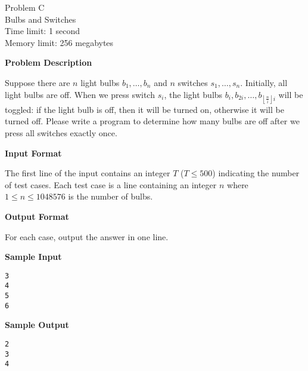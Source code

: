 \documentclass[11pt]{article}
\begin{document}
\begin{center}
    {\LARGE Problem C}\\
    {\Large Bulbs and Switches}\\
    {Time limit: 1 second}\\
    {Memory limit: 256 megabytes}
\end{center}

\textbf{\large Problem Description}

Suppose there are $n$ light bulbs $b_1,\dots,b_n$ and $n$ switches 
$s_1,\dots,s_n$. Initially, all light bulbs are off. When we press switch
$s_i$, the light bulbs $b_i,b_{2i},\dots,b_{\left\lfloor\frac{n}{i}\right\rfloor
i}$ will be toggled: if the light bulb is off, then it will be turned on,
otherwise it will be turned off. Please write a program to determine how
many bulbs are off after we press all switches exactly once.

\textbf{\large Input Format}

The first line of the input contains an integer $T$ ($T\le 500$) indicating 
the number of test cases. Each test case is a line containing an integer $n$
where $1\le n\le 1048576$ is the number of bulbs.

\textbf{\large Output Format}

For each case, output the answer in one line.

\textbf{\large Sample Input}

\begin{verbatim}
3
4
5
6
\end{verbatim}

\textbf{\large Sample Output}
\begin{verbatim}
2
3
4
\end{verbatim}
\end{document}
